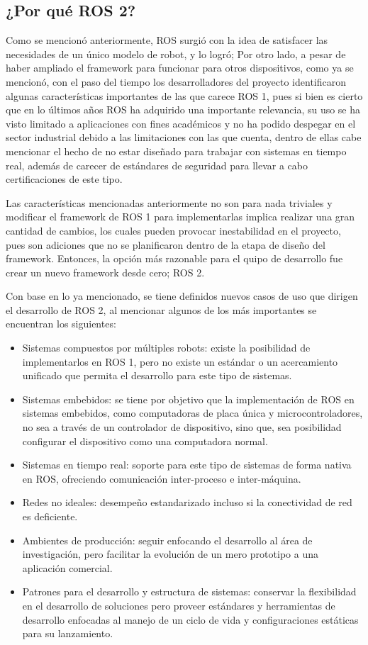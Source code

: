 \subsection{¿Por qué ROS 2?}

Como se mencionó anteriormente, ROS surgió con la idea de satisfacer las necesidades de un único modelo de robot, y lo logró; Por otro lado, a pesar de haber ampliado el framework para funcionar para otros dispositivos, como ya se mencionó, con el paso del tiempo los desarrolladores del proyecto identificaron algunas características importantes de las que carece ROS 1, pues si bien es cierto que en lo últimos años ROS ha adquirido una importante relevancia, su uso se ha visto limitado a aplicaciones con fines académicos y no ha podido despegar en el sector industrial debido a las limitaciones con las que cuenta, dentro de ellas cabe mencionar el hecho de no estar diseñado para trabajar con sistemas en tiempo real, además de carecer de estándares de seguridad para llevar a cabo certificaciones de este tipo. 

Las características mencionadas anteriormente no son para nada triviales y modificar el framework de ROS 1 para implementarlas implica realizar una gran cantidad de cambios, los cuales pueden provocar inestabilidad en el proyecto, pues son adiciones que no se planificaron dentro de la etapa de diseño del framework. Entonces, la opción más razonable para el quipo de desarrollo fue crear un nuevo framework desde cero; ROS 2. 

Con base en lo ya mencionado, se tiene definidos nuevos casos de uso que dirigen el desarrollo de ROS 2, al mencionar algunos de los más importantes se encuentran los siguientes:

\begin{itemize}
    \item Sistemas compuestos por múltiples robots: existe la posibilidad de implementarlos en ROS 1, pero no existe un estándar o un acercamiento unificado que permita el desarrollo para este tipo de sistemas.
    \item Sistemas embebidos: se tiene por objetivo que la implementación de ROS en sistemas embebidos, como computadoras de placa única y microcontroladores, no sea a través de un controlador de dispositivo, sino que, sea posibilidad configurar el dispositivo como una computadora normal.
    \item Sistemas en tiempo real: soporte para este tipo de sistemas de forma nativa en ROS, ofreciendo comunicación inter-proceso e inter-máquina.
    \item Redes no ideales: desempeño estandarizado incluso si la conectividad de red es deficiente.
    \item Ambientes de producción: seguir enfocando el desarrollo al área de investigación, pero facilitar la evolución de un mero prototipo a una aplicación comercial.
    \item Patrones para el desarrollo y estructura de sistemas: conservar la flexibilidad en el desarrollo de soluciones pero proveer estándares y herramientas de desarrollo enfocadas al manejo de un ciclo de vida y configuraciones estáticas para su lanzamiento.
\end{itemize}


